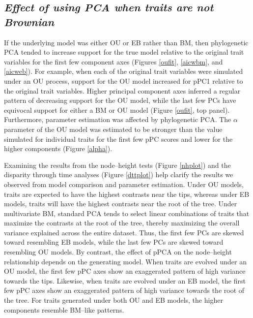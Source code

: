 \documentclass[a4paper,11pt]{article}
\begin{document}
\subsection{\emph{Effect of using PCA when traits are not Brownian}}
If the underlying model was either OU or EB rather than BM, then phylogenetic PCA tended to increase support for the true model relative to the original trait variables for the first few component axes (Figures \ref{oufit}, \ref{aicwbm}, and \ref{aicweb}). For example, when each of the original trait variables were simulated under an OU process, support for the OU model increased for pPC1 relative to the original trait variables. Higher principal component axes inferred a regular pattern of decreasing support for the OU model, while the last few PCs have equivocal support for either a BM or OU model (Figure \ref{oufit}, top panel). Furthermore, parameter estimation was affected by phylogenetic PCA. The $\alpha$ parameter of the OU model was estimated to be stronger than the value simulated for individual traits for the first few pPC scores and lower for the higher components (Figure \ref{alpha}). 

Examining the results from the node--height tests (Figure \ref{nhplot}) and the disparity through time analyses (Figure \ref{dttplot}) help clarify the results we observed from model comparison and parameter estimation. Under OU models, traits are expected to have the highest contrasts near the tips, whereas under EB models, traits will have the highest contrasts near the root of the tree. Under multivariate BM, standard PCA tends to select linear combinations of traits that maximize the contrasts at the root of the tree, thereby maximizing the overall variance explained across the entire dataset. Thus, the first few PCs are skewed toward resembling EB models, while the last few PCs are skewed toward resembling OU models. By contrast, the effect of pPCA on the node--height relationship depends on the generating model. When traits are evolved under an OU model, the first few pPC axes show an exaggerated pattern of high variance towards the tips. Likewise, when traits are evolved under an EB model, the first few pPC axes show an exaggerated pattern of high variance towards the root of the tree. For traits generated under both OU and EB models, the higher components resemble BM--like patterns. 
\end{document}
